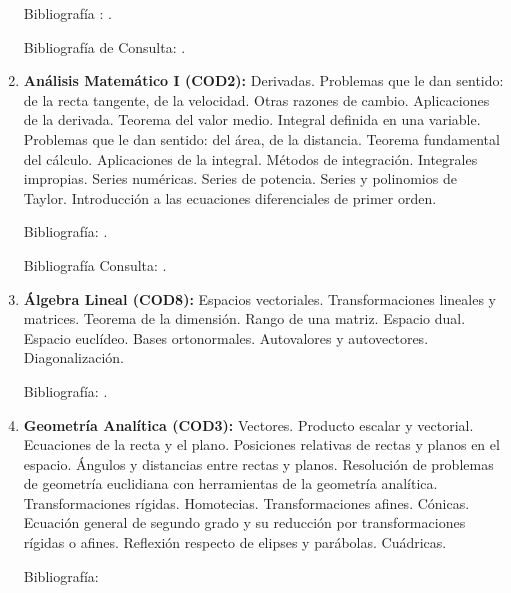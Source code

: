 \documentclass[a4paper, 12pt]{article}
\begin{document}
\begin{enumerate}
Bibliografía : \cite{AllanBerele41,RogerFenn248,RobinHartshorne131,AlfredS.Posamentier49}.

Bibliografía de Consulta: \cite{O.Bottema149,CharlesStanleyOgilvy129,AllanBerele41,GerardA.Venema145,H.S.M.Coxeter226,H.S.M.Coxeter35,MatthewHarvey261,RogerA.Johnson42,GeorgeA.Jennings273,villamayor}.




\item \textbf{Análisis Matemático I (COD2):}   Derivadas.  Problemas que le dan sentido: de la recta tangente, de la velocidad. Otras razones de cambio. Aplicaciones de la derivada. Teorema del valor medio. Integral definida en una variable.  Problemas que le dan sentido:  del área, de la distancia. Teorema fundamental del cálculo. Aplicaciones de la integral. Métodos de integración. Integrales impropias. Series numéricas. Series de potencia. Series y polinomios  de Taylor.  Introducción a las ecuaciones diferenciales de primer orden.

Bibliografía: \cite{PeterD.Lax631,MichaelSpivak649,thomas2005calculo,GeorgeFinlaySimmons487,thomas2005calculo}.
 

Bibliografía Consulta: \cite{ErnstHairer633,DavidApplebaum639,OttoToeplitz642,DavidBressoud643,DavidM.Bressoud651,DavidM.Bressoud688}.


\item \textbf{Álgebra Lineal  (COD8):} Espacios vectoriales. Transformaciones
lineales y matrices. Teorema de la dimensión. Rango de una matriz.
Espacio dual. Espacio euclídeo. 
Bases ortonormales. 
Autovalores y autovectores. Diagonalización.

Bibliografía: \cite{hoffman, strang}.


\item \textbf{Geometría Analítica (COD3):} 
Vectores. Producto escalar y vectorial. Ecuaciones de la recta y el plano. Posiciones relativas de rectas y planos en el espacio. Ángulos y distancias entre rectas y planos. Resolución de problemas de geometría euclidiana con herramientas de la geometría analítica. Transformaciones rígidas. Homotecias. Transformaciones afines. Cónicas. Ecuación general de segundo grado y su reducción por transformaciones rígidas o afines. Reflexión respecto de elipses y parábolas. Cuádricas.



Bibliografía: \cite{H.S.M.Coxeter226,DavidABrannan247,MicheleAudin38,RogerFenn248,VagnLundsgaardHansen85,C.G.Gibson97,GeorgeA.Jennings273,ArsenyV.Akopyan95,IlkaAgricola77}



\end{enumerate}
\end{document}
